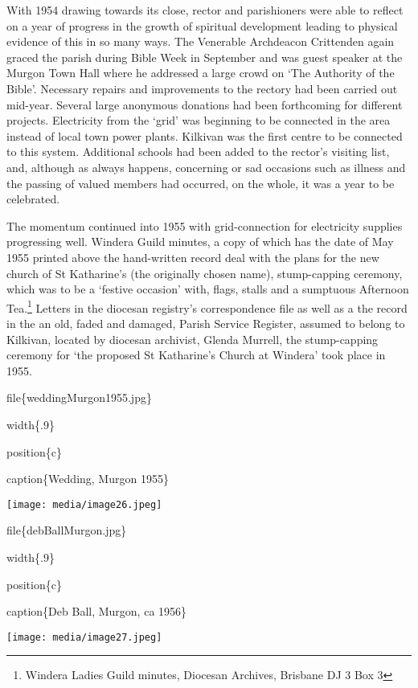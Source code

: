 With 1954 drawing towards its close, rector and parishioners were able to reflect on a year of progress in the growth of spiritual development leading to physical evidence of this in so many ways. The Venerable Archdeacon Crittenden again graced the parish during Bible Week in September and was guest speaker at the Murgon Town Hall where he addressed a large crowd on `The Authority of the Bible'. Necessary repairs and improvements to the rectory had been carried out mid-year. Several large anonymous donations had been forthcoming for different projects. Electricity from the `grid' was beginning to be connected in the area instead of local town power plants. Kilkivan was the first centre to be connected to this system. Additional schools had been added to the rector's visiting list, and, although as always happens, concerning or sad occasions such as illness and the passing of valued members had occurred, on the whole, it was a year to be celebrated.

The momentum continued into 1955 with grid-connection for electricity supplies progressing well. Windera Guild minutes, a copy of which has the date of May 1955 printed above the hand-written record deal with the plans for the new church of St Katharine's (the originally chosen name), stump-capping ceremony, which was to be a `festive occasion' with, flags, stalls and a sumptuous Afternoon Tea.\footnote{Windera Ladies Guild minutes, Diocesan Archives, Brisbane DJ 3 Box 3} Letters in the diocesan registry's correspondence file as well as a the record in the an old, faded and damaged, Parish Service Register, assumed to belong to Kilkivan, located by diocesan archivist, Glenda Murrell, the stump-capping ceremony for `the proposed St Katharine's Church at Windera' took place in 1955.

file\{weddingMurgon1955.jpg\}

width\{.9\}

position\{c\}

caption\{Wedding, Murgon 1955\}

\texttt{[image: media/image26.jpeg]}

file\{debBallMurgon.jpg\}

width\{.9\}

position\{c\}

caption\{Deb Ball, Murgon, ca 1956\}

\texttt{[image: media/image27.jpeg]}

